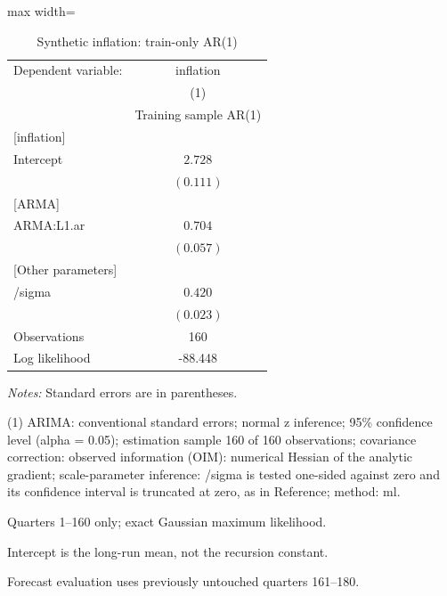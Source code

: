 \begin{table}[htbp]
\centering
\caption{Synthetic inflation: train-only AR(1)}
\begingroup
\small
\setlength{\tabcolsep}{6pt}
\renewcommand{\arraystretch}{1.12}
\begin{adjustbox}{max width=\linewidth}
\begin{tabular}{@{}lc@{}}
\toprule
Dependent variable: & inflation \\
 & (1) \\
 & Training sample AR(1) \\
\midrule
{[inflation]} &  \\
Intercept & $2.728$ \\
 & $(0.111)$ \\[0.35em]
{[ARMA]} &  \\
ARMA:L1.ar & $0.704$ \\
 & $(0.057)$ \\[0.35em]
{[Other parameters]} &  \\
/sigma & $0.420$ \\
 & $(0.023)$ \\[0.35em]
\midrule
Observations & 160 \\
Log likelihood & -88.448 \\
\bottomrule
\end{tabular}
\end{adjustbox}
\par\smallskip
\begin{minipage}{\linewidth}
\footnotesize
\raggedright
\textit{Notes:} Standard errors are in parentheses.\par
(1) ARIMA: conventional standard errors; normal z inference; 95\% confidence level (alpha = 0.05); estimation sample 160 of 160 observations; covariance correction: observed information (OIM): numerical Hessian of the analytic gradient; scale-parameter inference: /sigma is tested one-sided against zero and its confidence interval is truncated at zero, as in Reference; method: ml.\par
Quarters 1–160 only; exact Gaussian maximum likelihood.\par
Intercept is the long-run mean, not the recursion constant.\par
Forecast evaluation uses previously untouched quarters 161–180.\par
\end{minipage}
\endgroup
\end{table}
